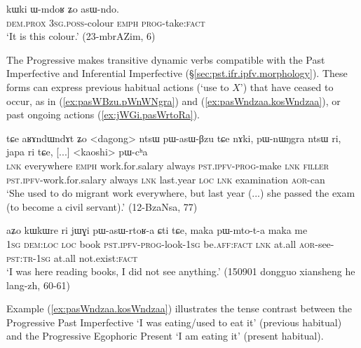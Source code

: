 \begin{exe}
\ex \label{ex:WmdoR.asWndo}
\gll kɯki ɯ-mdoʁ ʑo asɯ-ndo. \\
\textsc{dem}.\textsc{prox} \textsc{3sg}.\textsc{poss}-colour \textsc{emph} \textsc{prog}-take:\textsc{fact} \\
\glt `It is this colour.' (23-mbrAZim, 6)
\end{exe}

The Progressive makes transitive dynamic verbs compatible with the Past Imperfective and Inferential Imperfective (§\ref{sec:pst.ifr.ipfv.morphology}). These forms can express previous habitual actions (`use to $X$') that have ceased to occur, as in (\ref{ex:pasWBzu.pWnWNgra}) and (\ref{ex:pasWndzaa.kosWndzaa}), or past ongoing actions (\ref{ex:jWGi.pasWrtoRa}).

\begin{exe}
\ex \label{ex:pasWBzu.pWnWNgra}
\gll tɕe aʁɤndɯndɤt ʑo <dagong> ntsɯ pɯ-asɯ-βzu tɕe nɤki, pɯ-nɯŋgra ntsɯ ri, japa ri tɕe, [...] <kaoshi> pɯ-cʰa \\
\textsc{lnk} everywhere \textsc{emph} work.for.salary always \textsc{pst}.\textsc{ipfv}-\textsc{prog}-make \textsc{lnk} \textsc{filler} \textsc{pst}.\textsc{ipfv}-work.for.salary always \textsc{lnk} last.year \textsc{loc} \textsc{lnk} {  } examination \textsc{aor}-can \\
\glt `She used to do migrant work everywhere, but last year (...) she passed the exam (to become a civil servant).' (12-BzaNsa, 77)
\end{exe}

\begin{exe}
\ex \label{ex:jWGi.pasWrtoRa}
\gll aʑo kɯkɯre ri jɯɣi pɯ-asɯ-rtoʁ-a ɕti tɕe, maka pɯ-mto-t-a maka me \\
\textsc{1sg} \textsc{dem}:\textsc{loc} \textsc{loc} book \textsc{pst}.\textsc{ipfv}-\textsc{prog}-look-\textsc{1sg} be.\textsc{aff}:\textsc{fact} \textsc{lnk} at.all \textsc{aor}-see-\textsc{pst}:\textsc{tr}-\textsc{1sg} at.all not.exist:\textsc{fact} \\
\glt `I was here reading books, I did not see anything.' (150901 dongguo xiansheng he lang-zh, 60-61)
\end{exe}

Example (\ref{ex:pasWndzaa.kosWndzaa}) illustrates the tense contrast between the Progressive Past Imperfective  `I was eating/used to eat it' (previous habitual) and the Progressive Egophoric Present  `I am eating it' (present habitual).

